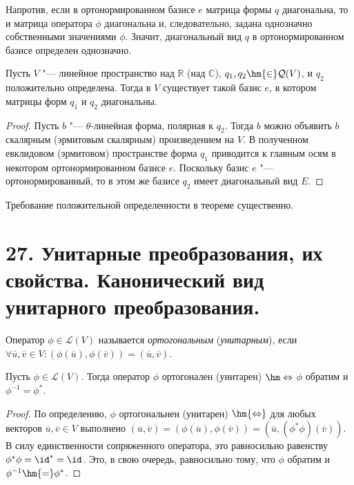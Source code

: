 \begin{note}
    Напротив, если в ортонормированном базисе $e$ матрица формы $q$ диагональна, то и матрица оператора $\phi$ диагональна и, следовательно, задана однозначно собственными значениями $\phi$. Значит, диагональный вид $q$ в ортонормированном базисе определен однозначно.
\end{note}

\begin{theorem}
    Пусть $V$ "--- линейное пространство над $\mathbb{R}$ (над $\mathbb{C}$), $q_1, q_2 \hm{\in} \mathcal{Q}(V)$, и $q_2$ положительно определена. Тогда в $V$ существует такой базис $e$, в котором матрицы форм $q_1$ и $q_2$ диагональны.
\end{theorem}

\begin{proof}
    Пусть $b$ "--- $\theta$-линейная форма, полярная к $q_2$. Тогда $b$  можно объявить $b$ скалярным (эрмитовым скалярным) произведением на $V$. В полученном евклидовом (эрмитовом) пространстве форма $q_1$ приводится к главным осям в некотором ортонормированном базисе $e$. Поскольку базис $e$ "--- ортонормированный, то в этом же базисе $q_2$ имеет диагональный вид $E$.
\end{proof}

\begin{note}
    Требование положительной определенности в теореме существенно.
\end{note}

\section{27. Унитарные преобразования, их свойства. Канонический вид унитарного преобразования.}

\begin{definition}
    Оператор $\phi \in \mathcal{L}(V)$ называется \textit{ортогональным} (\textit{унитарным}), если $\forall \overline{u}, \overline{v} \in V: (\phi(\overline{u}), \phi(\overline{v})) = (\overline{u}, \overline{v})$.
\end{definition}

\begin{theorem}
    Пусть $\phi \in \mathcal{L}(V)$. Тогда оператор $\phi$ ортогонален (унитарен) $\hm\Leftrightarrow$ $\phi$ обратим и $\phi^{-1} = \phi^{*}$.
\end{theorem}

\begin{proof}
    По определению, $\phi$ ортогональнен (унитарен) $\hm{\Leftrightarrow}$ для любых векторов $\overline{u}, \overline{v} \in V$ выполнено $(\overline{u}, \overline{v}) = (\phi(\overline{u}), \phi(\overline{v})) = (\overline{u}, (\phi^*\phi)(\overline{v}))$. В силу единственности сопряженного оператора, это равносильно равенству $\phi^*\phi = \id^* = \id$. Это, в свою очередь, равносильно тому, что $\phi$ обратим и $\phi^{-1} \hm{=} \phi^{*}$.
\end{proof}

